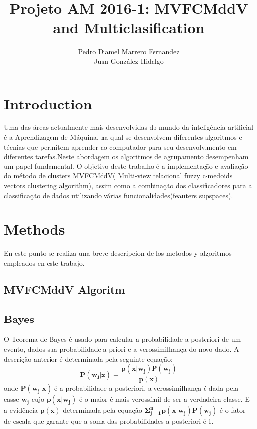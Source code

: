 \documentclass[12pt]{article}
\author{Pedro Diamel Marrero Fernandez \\ Juan González Hidalgo}
\title{Projeto AM 2016-1: MVFCMddV and Multiclasification}
\begin{document}
\maketitle



\section*{Introduction}
Uma das áreas actualmente mais desenvolvidas do mundo da inteligência artificial é a Aprendizagem de Máquina, na qual se desenvolvem diferentes algoritmos e técnias que permitem aprender ao computador para seu desenvolvimento em diferentes tarefas.Neste abordagem os algoritmos de agrupamento desempenham um papel fundamental. O objetivo deste trabalho é a implementação e avaliação do método de clusters MVFCMddV( Multi-view relacional fuzzy c-medoids vectors clustering algorithm), assim como a combinação dos classificadores para a classificação de dados utilizando várias funcionalidades(feauters supspaces).

\section{Methods}
En este punto se realiza una breve descripcion de los metodos y algoritmos empleados en este trabajo. 

\subsection{MVFCMddV Algoritm}

\subsection{Bayes}
O Teorema de Bayes é usado para calcular a probabilidade a posteriori de um evento, dados sua probabilidade a priori e a verossimilhança do novo dado. A descrição anterior é determinada pela seguinte equação:
\begin{equation}
\mathbf{P(w_j\vert x)= \dfrac{p(x\vert w_j) P(w_j)}{p(x)} }
\end{equation}
onde $\mathbf{P(w_j\vert x)}$ é a probabilidade a posteriori, a verossimilhança  é dada pela casse $\mathbf{w_j}$ cujo $\mathbf{p(x\vert w_j)}$ é o maior é mais verossímil de ser a verdadeira classe. E a evidência $\mathbf{p(x)}$ determinada pela equação $\mathbf{\Sigma_{j=1}^{n} p(x\vert w_j) P(w_j)}$ é o fator de escala que garante que a
soma das probabilidades a posteriori é 1.
\end{document}
